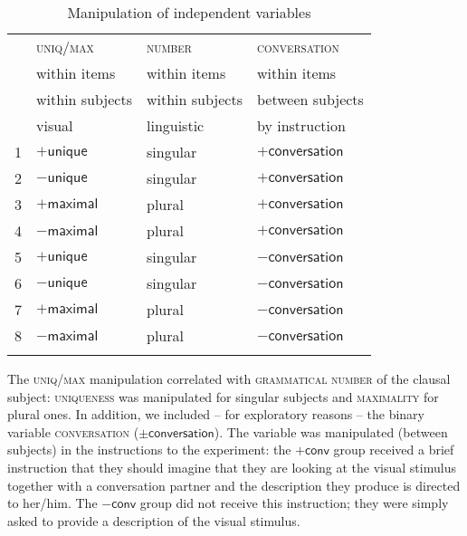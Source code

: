 \documentclass[output=paper]{langscibook}
\begin{document}
\begin{table}[t]
    \centering
    \begin{tabularx}{.8\textwidth}{rXXX}
    \lsptoprule
         &\textsc{uniq/max}&\textsc{number}&\textsc{conversation}\smallskip\\
         &within items&within items&within items\\
         &within subjects&within subjects&between subjects\smallskip\\
         &visual&linguistic&by instruction\\\midrule
         1&$+\textsf{unique}$&\textsf{singular}&$+\textsf{conversation}$\\
         2&$-\textsf{unique}$&\textsf{singular}&$+\textsf{conversation}$\\
         3&$+\textsf{maximal}$&\textsf{plural}&$+\textsf{conversation}$\\
         4&$-\textsf{maximal}$&\textsf{plural}&$+\textsf{conversation}$\\
         5&$+\textsf{unique}$&\textsf{singular}&$-\textsf{conversation}$\\
         6&$-\textsf{unique}$&\textsf{singular}&$-\textsf{conversation}$\\
         7&$+\textsf{maximal}$&\textsf{plural}&$-\textsf{conversation}$\\
         8&$-\textsf{maximal}$&\textsf{plural}&$-\textsf{conversation}$\\
    \lspbottomrule
    \end{tabularx}
    \caption{Manipulation of independent variables}
    \label{sim-dem:tab:factors}
\end{table}

The \textsc{uniq/max} manipulation correlated with \textsc{grammatical number} of the clausal subject: \textsc{uniqueness} was manipulated for \textsf{singular} subjects and \textsc{maximality} for \textsf{plural} ones. In addition, we included -- for exploratory reasons -- the binary variable \textsc{conversation} ($\pm\textsf{conversation}$). The variable was manipulated (between subjects) in the instructions to the experiment: the $+\textsf{conv}$ group received a brief instruction that they should imagine that they are looking at the visual stimulus together with a conversation partner and the description they produce is directed to her/him. The $-\textsf{conv}$ group did not receive this instruction; they were simply asked to provide a description of the visual stimulus.
\end{document}
